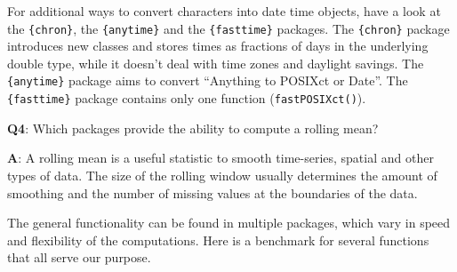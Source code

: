 \documentclass[
]{krantz}
\begin{document}
For additional ways to convert characters into date time objects, have a look at the \texttt{\{chron\}}, the \texttt{\{anytime\}} and the \texttt{\{fasttime\}} packages. The \texttt{\{chron\}} package introduces new classes and stores times as fractions of days in the underlying double type, while it doesn't deal with time zones and daylight savings. The \texttt{\{anytime\}} package aims to convert ``Anything to POSIXct or Date''. The \texttt{\{fasttime\}} package contains only one function (\texttt{fastPOSIXct()}).

\textbf{{Q4}}: Which packages provide the ability to compute a rolling mean?

\textbf{{A}}: A rolling mean is a useful statistic to smooth time-series, spatial and other types of data. The size of the rolling window usually determines the amount of smoothing and the number of missing values at the boundaries of the data.

The general functionality can be found in multiple packages, which vary in speed and flexibility of the computations. Here is a benchmark for several functions that all serve our purpose.
\end{document}
